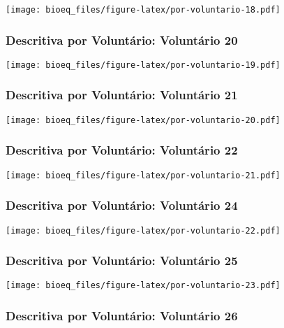 \documentclass[
]{article}
\begin{document}
\texttt{[image: bioeq\_files/figure-latex/por-voluntario-18.pdf]}

\hypertarget{descritiva-por-voluntuxe1rio-voluntuxe1rio-20}{%
\subsubsection{Descritiva por Voluntário: Voluntário
20}\label{descritiva-por-voluntuxe1rio-voluntuxe1rio-20}}

\texttt{[image: bioeq\_files/figure-latex/por-voluntario-19.pdf]}

\hypertarget{descritiva-por-voluntuxe1rio-voluntuxe1rio-21}{%
\subsubsection{Descritiva por Voluntário: Voluntário
21}\label{descritiva-por-voluntuxe1rio-voluntuxe1rio-21}}

\texttt{[image: bioeq\_files/figure-latex/por-voluntario-20.pdf]}

\hypertarget{descritiva-por-voluntuxe1rio-voluntuxe1rio-22}{%
\subsubsection{Descritiva por Voluntário: Voluntário
22}\label{descritiva-por-voluntuxe1rio-voluntuxe1rio-22}}

\texttt{[image: bioeq\_files/figure-latex/por-voluntario-21.pdf]}

\hypertarget{descritiva-por-voluntuxe1rio-voluntuxe1rio-24}{%
\subsubsection{Descritiva por Voluntário: Voluntário
24}\label{descritiva-por-voluntuxe1rio-voluntuxe1rio-24}}

\texttt{[image: bioeq\_files/figure-latex/por-voluntario-22.pdf]}

\hypertarget{descritiva-por-voluntuxe1rio-voluntuxe1rio-25}{%
\subsubsection{Descritiva por Voluntário: Voluntário
25}\label{descritiva-por-voluntuxe1rio-voluntuxe1rio-25}}

\texttt{[image: bioeq\_files/figure-latex/por-voluntario-23.pdf]}

\hypertarget{descritiva-por-voluntuxe1rio-voluntuxe1rio-26}{%
\subsubsection{Descritiva por Voluntário: Voluntário
26}\label{descritiva-por-voluntuxe1rio-voluntuxe1rio-26}}
\end{document}
